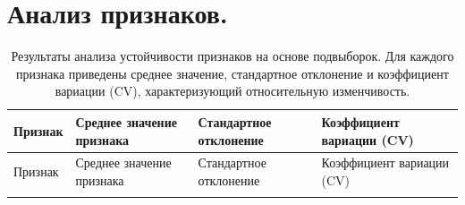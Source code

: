 \documentclass[specification,annotation,times]{itmo-student-thesis}
\begin{document}
\chapter{Анализ признаков.}\label{sec:app:5:tab-data}


\begin{longtable}{
| >{\centering\arraybackslash}p{3.2cm}
| >{\centering\arraybackslash}p{3.5cm}
| >{\centering\arraybackslash}p{3.5cm}
| >{\centering\arraybackslash}p{3.2cm} |
}

\caption{Результаты анализа устойчивости признаков на основе подвыборок. Для каждого признака приведены среднее значение, стандартное отклонение и коэффициент вариации (CV), характеризующий относительную изменчивость.}
\label{tab:cv_features} \\

\hline
Признак & Среднее значение признака & Стандартное отклонение & Коэффициент вариации (CV) \\
\hline
\endfirsthead

\hline
Признак & Среднее значение признака & Стандартное отклонение & Коэффициент вариации (CV) \\
\hline
\endhead

\hline
\endfoot

\hline
\endlastfoot


\end{longtable}
\end{document}
